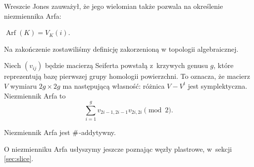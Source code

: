 Wreszcie Jones zauważył, że jego wielomian także pozwala na określenie niezmiennika Arfa:

\begin{proposition}[Jones, 1985]
    $\operatorname{Arf}(K) = V_K(i)$.
\end{proposition}

Na zakończenie zostawiliśmy definicję zakorzenioną w topologii algebraicznej.

\begin{proposition}
    Niech $(v_{ij})$ będzie macierzą Seiferta powstałą z~krzywych genusu $g$, które reprezentują bazę pierwszej grupy homologii powierzchni.
    To oznacza, że macierz $V$ wymiaru $2g \times 2g$ ma następującą własność: różnica $V - V^t$ jest symplektyczna.
    Niezmiennik Arfa to
    \begin{equation}
        \sum^g_{i=1}v_{2i-1,2i-1}v_{2i,2i} \pmod 2.
    \end{equation}
\end{proposition}

\begin{proposition}
    Niezmiennik Arfa jest $\mathbin{\#}$-addytywny.
\end{proposition}

O niezmienniku Arfa usłyszymy jeszcze poznając węzły plastrowe, w~sekcji \ref{sec:slice}.

